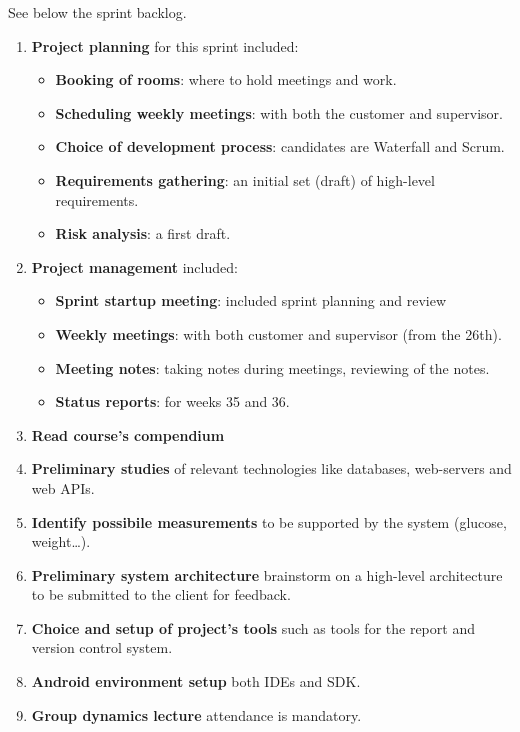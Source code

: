 See below the sprint backlog.
\begin{enumerate}[1.]
	\item \textbf{Project planning} for this sprint included:
		\begin{itemize}
			\item \textbf{Booking of rooms}:
				where to hold meetings and work.
			\item \textbf{Scheduling weekly meetings}:
				with both the customer and supervisor.
			\item \textbf{Choice of development process}:
				candidates are Waterfall and Scrum.
			\item \textbf{Requirements gathering}:
				an initial set (draft) of high-level requirements.
			\item \textbf{Risk analysis}:
				a first draft.
		\end{itemize}
	\item \textbf{Project management} included:
		\begin{itemize}
			\item \textbf{Sprint startup meeting}:
				included sprint planning and review
			\item \textbf{Weekly meetings}:
				with both customer and supervisor (from the 26th).
			\item \textbf{Meeting notes}:
				taking notes during meetings, reviewing of the notes.
			\item \textbf{Status reports}:
				for weeks 35 and 36.
		\end{itemize}
	\item \textbf{Read course's compendium}
	\item \textbf{Preliminary studies}\newline
		of relevant technologies like databases, web-servers and web APIs.
	\item \textbf{Identify possibile measurements}\newline
		to be supported by the system (glucose, weight\ldots).
	\item \textbf{Preliminary system architecture}\newline
		brainstorm on a high-level architecture to be submitted to the client for feedback.
	\item \textbf{Choice and setup of project's tools}\newline
		such as tools for the report and version control system.
	\item \textbf{Android environment setup}\newline
		both IDEs and SDK.
	\item \textbf{Group dynamics lecture}\newline
		attendance is mandatory.
\end{enumerate}


